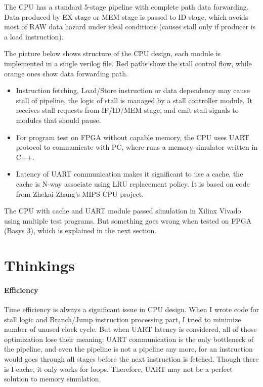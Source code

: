 \documentclass[12pt, a4paper]{article}
\theoremstyle{margin}
\begin{document}
The CPU has a standard 5-stage pipeline with complete path data forwarding. Data produced by EX stage or MEM stage is passed to ID stage, which avoids most of RAW data hazard under ideal conditions (causes stall only if producer is a load instruction).

The picture below shows structure of the CPU design, each module is implemented in a single verilog file. Red paths show the stall control flow, while orange ones show data forwarding path.

\begin{itemize}
	\item Instruction fetching, Load/Store instruction or data dependency may cause stall of pipeline, the logic of stall is managed by a stall controller module. It receives stall requests from IF/ID/MEM stage, and emit stall signals to modules that should pause.

	\item For program test on FPGA without capable memory, the CPU uses UART protocol to communicate with PC, where runs a memory simulator written in C++.

	\item Latency of UART communication makes it significant to use a cache, the cache is N-way associate using LRU replacement policy. It is based on code from Zhekai Zhang's MIPS CPU project.
\end{itemize}

The CPU with cache and UART module passed simulation in Xilinx Vivado using multiple test programs. But something goes wrong when tested on FPGA (Basys 3), which is explained in the next section.

\section{Thinkings}

\paragraph{Efficiency} Time efficiency is always a significant issue in CPU design. When I wrote code for stall logic and Branch/Jump instruction processing part, I tried to minimize number of unused clock cycle. But when UART latency is considered, all of those optimization lose their meaning: UART communication is the only bottleneck of the pipeline, and even the pipeline is not a pipeline any more, for an instruction would goes through all stages before the next instruction is fetched. Though there is I-cache, it only works for loops. Therefore, UART may not be a perfect solution to memory simulation.
\end{document}

